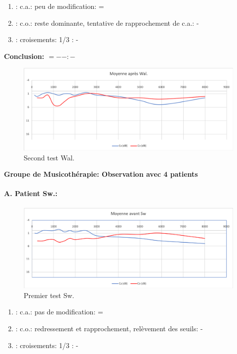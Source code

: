 	\begin{enumerate}
 		
 		\item : c.a.: peu de modification: =
                
 		\item : c.o.: reste dominante, tentative de rapprochement de c.a.: -
 		\item : croisements: 1/3 :  -
                  
                \end{enumerate}

                \textbf{ Conclusion:  $= -  -        : -$ }

               \begin{figure}
\centering
\includegraphics[width=0.7\linewidth]{images/graphiques/wal_post.png}
\caption[Moyenne OG+OD]{Second test Wal.}
       
\label{groupecontroleimage1}
\end{figure}
                
  \textbf{ Groupe de Musicothérapie: Observation avec 4 patients}

\paragraph{ A. Patient Sw.:}



 \begin{figure}[th]
\centering
\includegraphics[width=0.7\linewidth]{images/graphiques/sw_pre.png}
\caption[Moyenne OG+OD]{Premier test Sw.}
       
\end{figure}

	\begin{enumerate}
 		
 		\item : c.a.: pas de modification: = %
                
 		\item : c.o.: redressement et rapprochement,
                  relèvement des seuils: -       %
 		\item : croisements: 1/3 :  -
                  
                \end{enumerate}

